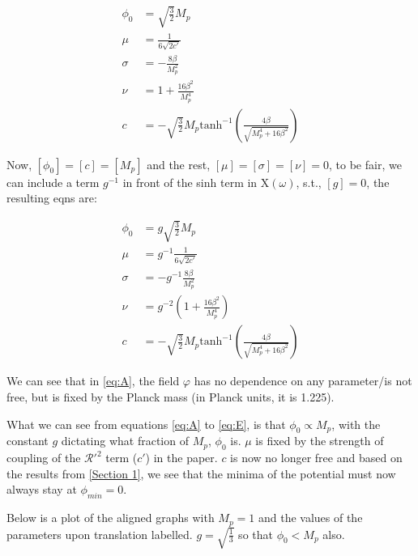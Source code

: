 \documentclass{article}
\begin{document}
\begin{align}
    \phi_0 &= \sqrt{\frac{3}{2}} M_p \label{eq:A} \\
    \mu &= \frac{1}{6 \sqrt{2 c'}} \label{eq:B} \\
    \sigma &= -\frac{8 \beta}{M_{p}^{2}} \label{eq:C} \\
    \nu &= 1 + \frac{16 \beta^2}{M_{p}^{4}} \label{eq:D} \\
    c  &= -\sqrt{\frac{3}{2}} M_{p} \text{tanh}^{-1} \left(\frac{4 \beta}{\sqrt{M_{p}^{4}+16 \beta^2}} \right) \label{eq:E}
\end{align}

Now, $[\phi_0] = [c] = [M_p]$ and the rest, $[\mu] = [\sigma] = [\nu] = 0$, to be fair, we can include a term $g^{-1}$ in front of the sinh term in $\text{X}(\omega)$, s.t., $[g] = 0$, the resulting eqns are:

\begin{align}
    \phi_0 &= g \sqrt{\frac{3}{2}} M_p \label{eq:A} \\
    \mu &= g^{-1} \frac{1}{6 \sqrt{2 c'}} \label{eq:B} \\
    \sigma &= - g^{-1} \frac{8 \beta}{M_{p}^{2}} \label{eq:C} \\
    \nu &= g^{-2} \left( 1 + \frac{16 \beta^2}{M_{p}^{4}} \right) \label{eq:D} \\
    c  &= -\sqrt{\frac{3}{2}} M_{p} \text{tanh}^{-1} \left(\frac{4 \beta}{\sqrt{M_{p}^{4}+16 \beta^2}} \right) \label{eq:E}
\end{align}

We can see that in \ref{eq:A}, the field $\varphi$ has no dependence on any parameter/is not free, but is fixed by the Planck mass (in Planck units, it is 1.225).

What we can see from equations \ref{eq:A} to \ref{eq:E}, is that $\phi_0 \propto M_p$, with the constant $g$ dictating what fraction of $M_p$,  $\phi_0$ is. $\mu$ is fixed by the strength of coupling of the $\mathcal{R'}^2$ term ($c'$) in the \cite{Pradisi_2022} paper. $c$ is now no longer free and based on the results from \ref{Section 1}, we see that the minima of the potential must now always stay at $\phi_{min} = 0$.

Below is a plot of the aligned graphs with $M_p = 1$ and the values of the parameters upon translation labelled. $g = \sqrt{\frac{1}{3}}$ so that $\phi_0 < M_p$ also.
\end{document}
